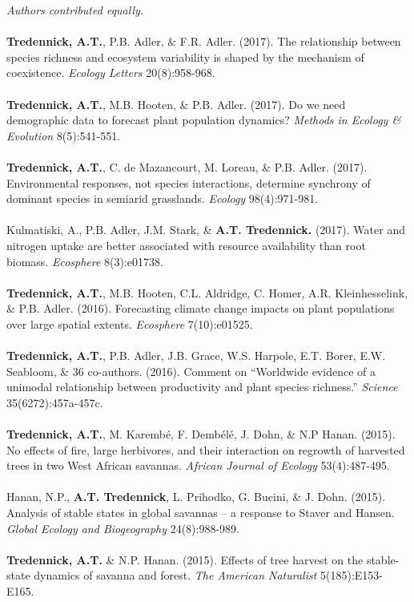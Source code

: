 \begin{pubentries}
\begin{\small}
{\footnotesize*{\emph{Authors contributed equally.}}}\\
\\
{\bf{Tredennick, A.T.}}, P.B. Adler, \& F.R. Adler. (2017). The relationship between species richness and ecosystem variability is shaped by the mechanism of coexistence. \emph{Ecology Letters} 20(8):958-968. \\
\\
{\bf{Tredennick, A.T.}}, M.B. Hooten, \& P.B. Adler. (2017). Do we need demographic data to forecast plant population dynamics? \emph{Methods in Ecology \& Evolution} 8(5):541-551.\\
\\
{\bf{Tredennick, A.T.}}, C. de Mazancourt, M. Loreau, \& P.B. Adler. (2017). Environmental responses, not species interactions, determine synchrony of dominant species in semiarid grasslands. \emph{Ecology} 98(4):971-981.\\
\\
Kulmatiski, A., P.B. Adler, J.M. Stark, \& {\bf{A.T. Tredennick.}} (2017). Water and nitrogen uptake are better associated with resource availability than root biomass. \emph{Ecosphere} 8(3):e01738.\\
\\
{\bf{Tredennick, A.T.}}, M.B. Hooten, C.L. Aldridge, C. Homer, A.R. Kleinhesselink, \& P.B. Adler. (2016). Forecasting climate change impacts on plant populations over large spatial extents. \emph{Ecosphere} 7(10):e01525.\\
\\
{\bf{Tredennick, A.T.}}, P.B. Adler, J.B. Grace, W.S. Harpole, E.T. Borer, E.W. Seabloom, \& 36 co-authors. (2016). Comment on “Worldwide evidence of a unimodal relationship between productivity and plant species richness.” \emph{Science} 35(6272):457a-457c.\\
\\
{\bf{Tredennick, A.T.}}, M. Karemb\'{e}, F. Demb\'{e}l\'{e}, J. Dohn, \& N.P Hanan. (2015). No effects of fire, large herbivores, and their interaction on regrowth of harvested trees in two West African savannas. \emph{African Journal of Ecology} 53(4):487-495.\\
\\
Hanan, N.P., {\bf{A.T. Tredennick}}, L. Prihodko, G. Bucini, \& J. Dohn. (2015). Analysis of stable states in global savannas – a response to Staver and Hansen. \emph{Global Ecology and Biogeography} 24(8):988-989.\\
\\
{\bf{Tredennick, A.T.}} \& N.P. Hanan. (2015). Effects of tree harvest on the stable-state dynamics of savanna and forest. \emph{The American Naturalist} 5(185):E153-E165.\\

\end{\small}
\end{pubentries}

